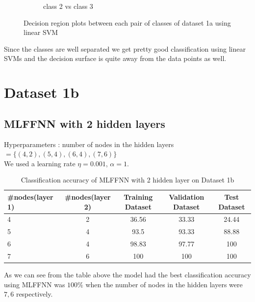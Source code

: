 \documentclass[11pt]{article}
\begin{document}
\begin{figure}[h!]
\begin{subfigure}[b]{0.45\textwidth}
	\caption{class 2 vs class 3}
	\label{fig:fig1.3.7.6}
	\end{subfigure}
\caption{Decision region plots between each pair of classes of dataset 1a using linear SVM}
\label{fig:fig1.3.7}
\end{figure}

Since the classes are well separated we get pretty good classification using linear SVMs and the decision surface is quite away from the data points as well.
\newpage

\section{Dataset 1b}
\subsection{MLFFNN with 2 hidden layers}

Hyperparameters : number of nodes in the hidden layers $= \{(4,2),(5,4),(6,4),(7,6)\}$\\

We used a learning rate $\eta = 0.001$, $\alpha = 1$. 
\begin{table}[h!]
\label{tab:tab2.1.1}
\begin{center}
\begin{tabular}{|l|c|c|c|c|}
\hline
\textbf{\#nodes(layer 1)} & \textbf{\#nodes(layer 2)} & \textbf{Training Dataset} & \textbf{Validation Dataset} &\textbf{Test Dataset}\\
\hline
4 & 2 &  36.56 & 33.33 & 24.44\\
\hline
5 & 4 & 93.5 & 93.33 & 88.88\\
\hline
6 & 4 & 98.83 & 97.77 & 100\\
\hline
7 & 6 & 100 & 100 & 100\\
\hline
\end{tabular}
\caption{Classification accuracy of MLFFNN with 2 hidden layer on Dataset 1b}
\end{center}
\end{table}

As we can see from the table above the model had the best classification accuracy using MLFFNN was $100\%$ when the number of nodes in the hidden layers were $7,6$ respectively.
\end{document}

